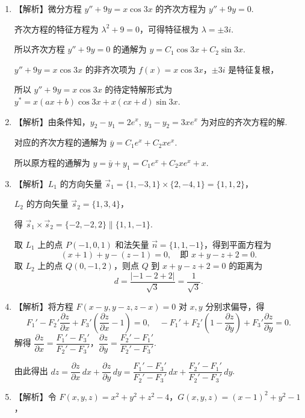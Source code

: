 \documentclass[a4paper,11pt]{ctexart}
\begin{document}
\begin{enumerate}[label=\arabic*、, leftmargin=2.2em, itemsep=0.9em, topsep=0.6em]
  \item 【解析】微分方程 $y'' + 9y = x\cos 3x$ 的齐次方程为 $y'' + 9y = 0$.

  齐次方程的特征方程为 $\lambda^2 + 9 = 0$，可得特征根为 $\lambda = \pm 3i$.

  所以齐次方程 $y'' + 9y = 0$ 的通解为 $y = C_1\cos 3x + C_2\sin 3x$.

  $y'' + 9y = x\cos 3x$ 的非齐次项为 $f(x) = x\cos 3x$，$\pm 3i$ 是特征复根，

  所以 $y'' + 9y = x\cos 3x$ 的待定特解形式为 $y^* = x(ax+b)\cos 3x + x(cx+d)\sin 3x$.

  \item 【解析】由条件知，$y_2 - y_1 = 2e^x,\ y_3 - y_2 = 3xe^x$ 为对应的齐次方程的解.

  对应的齐次方程的通解为 $\bar{y} = C_1e^x + C_2xe^x$.

  所以原方程的通解为 $y = \bar{y} + y_1 = C_1e^x + C_2xe^x + x$.

  \item 【解析】$L_1$ 的方向矢量 $\vec{s}_1 = \{1,-3,1\} \times \{2,-4,1\} = \{1,1,2\}$，

  $L_2$ 的方向矢量 $\vec{s}_2 = \{1,3,4\}$，

  得 $\vec{s}_1 \times \vec{s}_2 = \{-2,-2,2\} \parallel \{1,1,-1\}$.

  取 $L_1$ 上的点 $P(-1,0,1)$ 和法矢量 $\vec{n} = \{1,1,-1\}$，得到平面方程为
  \[
    (x+1) + y - (z-1) = 0, \quad \text{即 } x + y - z + 2 = 0.
  \]
  取 $L_2$ 上的点 $Q(0,-1,2)$，则点 $Q$ 到 $x + y - z + 2 = 0$ 的距离为
  \[
    d = \frac{|-1 - 2 + 2|}{\sqrt{3}} = \frac{1}{\sqrt{3}}.
  \]

  \item 【解析】将方程 $F(x-y, y-z, z-x) = 0$ 对 $x, y$ 分别求偏导，得
  \[
    F_1' - F_2'\frac{\partial z}{\partial x} + F_3'\left(\frac{\partial z}{\partial x} - 1\right) = 0, \quad
    -F_1' + F_2'\left(1 - \frac{\partial z}{\partial y}\right) + F_3'\frac{\partial z}{\partial y} = 0.
  \]
  解得 $\dfrac{\partial z}{\partial x} = \dfrac{F_1' - F_3'}{F_2' - F_3'}$，$\dfrac{\partial z}{\partial y} = \dfrac{F_2' - F_1'}{F_2' - F_3'}$.

  由此得出 $dz = \dfrac{\partial z}{\partial x}\,dx + \dfrac{\partial z}{\partial y}\,dy = \dfrac{F_1' - F_3'}{F_2' - F_3'}\,dx + \dfrac{F_2' - F_1'}{F_2' - F_3'}\,dy$.

  \item 【解析】令 $F(x,y,z) = x^2 + y^2 + z^2 - 4$，$G(x,y,z) = (x-1)^2 + y^2 - 1$，


\end{enumerate}
\end{document}
